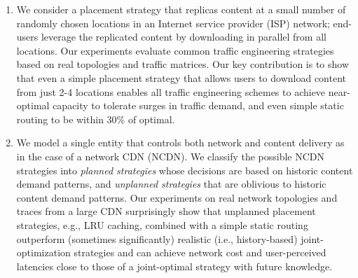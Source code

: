 \begin{enumerate}
\item
We consider a placement strategy that replicas content at a small number of randomly chosen locations in an Internet service provider (ISP) network; end-users leverage the replicated content by downloading in parallel from all locations. 
Our experiments evaluate common traffic engineering strategies based on real topologies and traffic matrices. 
Our key contribution is to show that even a simple placement strategy that allows users to download content from just 2-4 locations enables all traffic engineering schemes to achieve near-optimal capacity to tolerate surges in traffic demand, and even simple static routing to be within 30\% of optimal. 
\item
We model a single entity that controls both network and content delivery as in the case of a network CDN (NCDN). 
We classify the possible NCDN strategies into \emph{planned strategies} whose decisions are based on historic content  demand patterns, and \emph{unplanned strategies} that are oblivious to historic content demand patterns.
Our experiments on real network topologies and traces from a large CDN surprisingly show that  unplanned placement strategies, e.g., LRU caching, combined with a simple static routing outperform (sometimes significantly)  realistic (i.e., history-based) joint-optimization strategies and can achieve network cost and user-perceived latencies close to those of a joint-optimal strategy with future knowledge. 

\end{enumerate}
